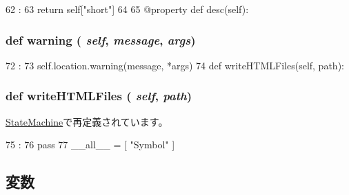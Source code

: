 \begin{DoxyCode}
62                    :
63         return self["short"]
64 
65     @property
    def desc(self):
\end{DoxyCode}
\hypertarget{classslicc_1_1symbols_1_1Symbol_1_1Symbol_ac1fc7cd7c75bbbeb7fcd0ada8bf86b81}{
\subsubsection[{warning}]{\setlength{\rightskip}{0pt plus 5cm}def warning ( {\em self}, \/   {\em message}, \/   {\em args})}}
\label{classslicc_1_1symbols_1_1Symbol_1_1Symbol_ac1fc7cd7c75bbbeb7fcd0ada8bf86b81}



\begin{DoxyCode}
72                                      :
73         self.location.warning(message, *args)
74 
    def writeHTMLFiles(self, path):
\end{DoxyCode}
\hypertarget{classslicc_1_1symbols_1_1Symbol_1_1Symbol_abc09a7197df5d7ef04e5cdfaa1139ead}{
\subsubsection[{writeHTMLFiles}]{\setlength{\rightskip}{0pt plus 5cm}def writeHTMLFiles ( {\em self}, \/   {\em path})}}
\label{classslicc_1_1symbols_1_1Symbol_1_1Symbol_abc09a7197df5d7ef04e5cdfaa1139ead}


\hyperlink{classslicc_1_1symbols_1_1StateMachine_1_1StateMachine_abc09a7197df5d7ef04e5cdfaa1139ead}{StateMachine}で再定義されています。


\begin{DoxyCode}
75                                   :
76         pass
77 
__all__ = [ "Symbol" ]
\end{DoxyCode}


\subsection{変数}
\hypertarget{classslicc_1_1symbols_1_1Symbol_1_1Symbol_a2fe57e2d3d2cba9a3aeba2f629eaa78b}{
\subsubsection[{ident}]{}}
\label{classslicc_1_1symbols_1_1Symbol_1_1Symbol_a2fe57e2d3d2cba9a3aeba2f629eaa78b}


